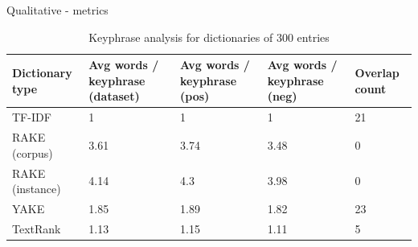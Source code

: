 \documentclass{beamer}
\begin{document}
\begin{frame}{Qualitative - metrics}
    \begin{table}[]
        \centering
        \begin{tabular}{|p{1.5cm}|p{2cm}|p{2cm}|p{2cm}|p{1cm}|}
        \hline
        Dictionary type& Avg words / keyphrase (dataset)& Avg words / keyphrase (pos) &Avg words / keyphrase (neg) & Overlap count\\\hline
        
        TF-IDF &1&1&1&21\\ \hline
        RAKE (corpus)&3.61&3.74&3.48&0\\ \hline
        RAKE (instance)&4.14&4.3&3.98&0\\ \hline
        YAKE&1.85&1.89&1.82&23\\ \hline
        TextRank&1.13&1.15&1.11&5\\ \hline
        
        
        \end{tabular}
        \caption{Keyphrase analysis for dictionaries of 300 entries}
        \label{tab:ke_eval}
    \end{table}

\end{frame}
\end{document}
